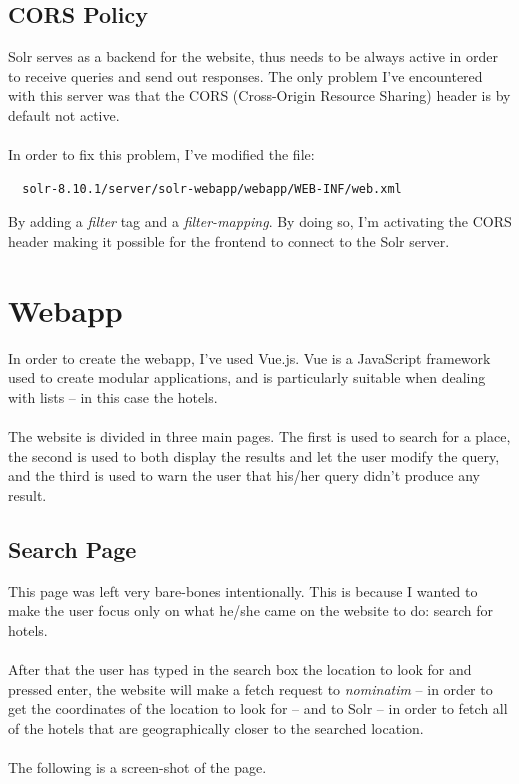 \documentclass[unicode,11pt,a4paper,oneside,numbers=endperiod,openany]{scrartcl}
\begin{document}
\subsection{CORS Policy}
Solr serves as a backend for the website, thus needs to be always active in order to receive queries and send out responses. The only problem I've encountered with this server was that the CORS (Cross-Origin Resource Sharing) header is by default not active. \\ \\
In order to fix this problem, I've modified the file:

\begin{verbatim}
  solr-8.10.1/server/solr-webapp/webapp/WEB-INF/web.xml
\end{verbatim}
By adding a \textit{filter} tag and a \textit{filter-mapping}. By doing so, I'm activating the CORS header making it possible for the frontend to connect to the Solr server.

\section{Webapp}
In order to create the webapp, I've used Vue.js. Vue is a JavaScript framework used to create modular applications, and is particularly suitable when dealing with lists -- in this case the hotels. \\ \\
The website is divided in three main pages. The first is used to search for a place, the second is used to both display the results and let the user modify the query, and the third is used to warn the user that his/her query didn't produce any result.

\subsection{Search Page}
This page was left very bare-bones intentionally. This is because I wanted to make the user focus only on what he/she came on the website to do: search for hotels. \\ \\
After that the user has typed in the search box the location to look for and pressed enter, the website will make a fetch request to \textit{nominatim} -- in order to get the coordinates of the location to look for -- and to Solr -- in order to fetch all of the hotels that are geographically closer to the searched location. \\ \\
The following is a screen-shot of the page.
\end{document}
